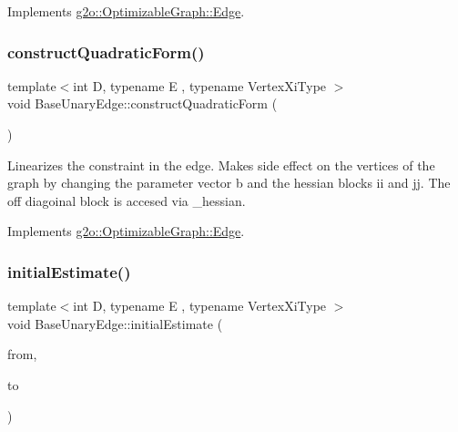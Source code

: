 Implements \mbox{\hyperlink{classg2o_1_1_optimizable_graph_1_1_edge_a414c69ca1617a4d3b620e39f2ffbcea7}{g2o\+::\+Optimizable\+Graph\+::\+Edge}}.

\mbox{\label{classg2o_1_1_base_unary_edge_ad7e6dc44c571be159f066bdb961ade2b}} 
\subsubsection{\texorpdfstring{construct\+Quadratic\+Form()}{constructQuadraticForm()}}
{\footnotesize\ttfamily template$<$int D, typename E , typename Vertex\+Xi\+Type $>$ \\
void Base\+Unary\+Edge\+::construct\+Quadratic\+Form (\begin{DoxyParamCaption}{ }\end{DoxyParamCaption})\hspace{0.3cm}{\ttfamily [virtual]}}

Linearizes the constraint in the edge. Makes side effect on the vertices of the graph by changing the parameter vector b and the hessian blocks ii and jj. The off diagoinal block is accesed via \+\_\+hessian. 

Implements \mbox{\hyperlink{classg2o_1_1_optimizable_graph_1_1_edge_a56fbf3430ddf591e3c619bdd1b7e4499}{g2o\+::\+Optimizable\+Graph\+::\+Edge}}.

\mbox{\label{classg2o_1_1_base_unary_edge_a3d3311901116092cf817b094f6a0b44b}} 
\subsubsection{\texorpdfstring{initial\+Estimate()}{initialEstimate()}}
{\footnotesize\ttfamily template$<$int D, typename E , typename Vertex\+Xi\+Type $>$ \\
void Base\+Unary\+Edge\+::initial\+Estimate (\begin{DoxyParamCaption}\item[{const \mbox{\hyperlink{classg2o_1_1_hyper_graph_a703938cdb4bb636860eed55a2489d70c}{Optimizable\+Graph\+::\+Vertex\+Set}} \&}]{from,  }\item[{\mbox{\hyperlink{classg2o_1_1_optimizable_graph_1_1_vertex}{Optimizable\+Graph\+::\+Vertex}} $\ast$}]{to }\end{DoxyParamCaption})\hspace{0.3cm}{\ttfamily [virtual]}}

